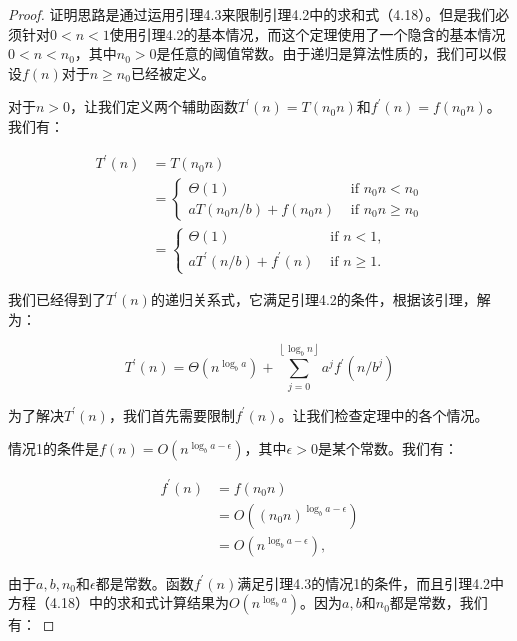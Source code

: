 \documentclass[lang=cn,newtx,10pt,scheme=chinese]{elegantbook}
\begin{document}
\begin{proof}
证明思路是通过运用引理4.3来限制引理4.2中的求和式（4.18）。但是我们必须针对$0<n<1$使用引理4.2的基本情况，而这个定理使用了一个隐含的基本情况$0<n<n_0$，其中$n_0>0$是任意的阈值常数。由于递归是算法性质的，我们可以假设$f(n)$对于$n \geq n_0$已经被定义。

对于$n>0$，让我们定义两个辅助函数$T^{\prime}(n)=T\left(n_0 n\right)$和$f^{\prime}(n)=f\left(n_0 n\right)$。我们有：

\begin{equation}
\begin{aligned}
T^{\prime}(n) & =T\left(n_0 n\right) \\
& = \begin{cases}\Theta(1) & \text { if } n_0 n<n_0 \\
a T\left(n_0 n / b\right)+f\left(n_0 n\right) & \text { if } n_0 n \geq n_0\end{cases} \\
& = \begin{cases}\Theta(1) & \text { if } n<1, \\
a T^{\prime}(n / b)+f^{\prime}(n) & \text { if } n \geq 1 .\end{cases}
\end{aligned}
\end{equation}

我们已经得到了$T^{\prime}(n)$的递归关系式，它满足引理4.2的条件，根据该引理，解为：

\begin{equation}
T^{\prime}(n)=\Theta\left(n^{\log _b a}\right)+\sum_{j=0}^{\left\lfloor\log _b n\right\rfloor} a^j f^{\prime}\left(n / b^j\right)
\end{equation}

为了解决$T^{\prime}(n)$，我们首先需要限制$f^{\prime}(n)$。让我们检查定理中的各个情况。

情况1的条件是$f(n)=O\left(n^{\log _b a-\epsilon}\right)$，其中$\epsilon>0$是某个常数。我们有：

$$
\begin{aligned}
f^{\prime}(n) & =f\left(n_0 n\right) \\
& =O\left(\left(n_0 n\right)^{\log _b a-\epsilon}\right) \\
& =O\left(n^{\log _b a-\epsilon}\right),
\end{aligned}
$$

由于$a, b, n_0$和$\epsilon$都是常数。函数$f^{\prime}(n)$满足引理4.3的情况1的条件，而且引理4.2中方程（4.18）中的求和式计算结果为$O\left(n^{\log _b a}\right)$。因为$a, b$和$n_0$都是常数，我们有：


\end{proof}
\end{document}
